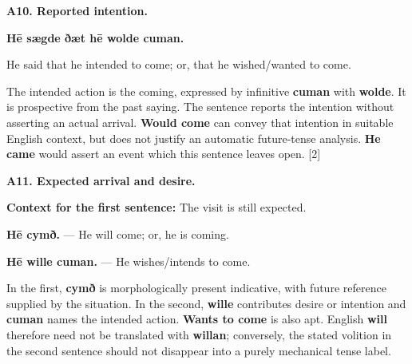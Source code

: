 \par\begin{minipage}{\linewidth}\raggedright
\textbf{A10. Reported intention.}

\textbf{Hē sægde ðæt hē wolde cuman.}

He said that he intended to come; or, that he wished/\allowbreak{}wanted to come.

The intended action is the coming, expressed by infinitive \textbf{cuman} with \textbf{wolde}. It is prospective from the past saying. The sentence reports the intention without asserting an actual arrival. \textbf{Would come} can convey that intention in suitable English context, but does not justify an automatic future-tense analysis. \textbf{He came} would assert an event which this sentence leaves open. [2]

\end{minipage}\par\addvspace{4pt}

\par\begin{minipage}{\linewidth}\raggedright
\textbf{A11. Expected arrival and desire.}

\textbf{Context for the first sentence:} The visit is still expected.

\textbf{Hē cymð.} — He will come; or, he is coming.

\textbf{Hē wille cuman.} — He wishes/\allowbreak{}intends to come.

In the first, \textbf{cymð} is morphologically present indicative, with future reference supplied by the situation. In the second, \textbf{wille} contributes desire or intention and \textbf{cuman} names the intended action. \textbf{Wants to come} is also apt. English \textbf{will} therefore need not be translated with \textbf{willan}; conversely, the stated volition in the second sentence should not disappear into a purely mechanical tense label.

\end{minipage}\par\addvspace{4pt}

